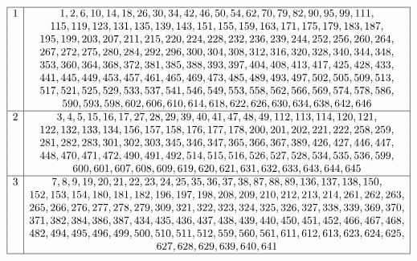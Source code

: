 \begin{table}[H]
	\[
	\begin{array}{|*{2}{c|}}
		\hline
		1 & 1, 2, 6, 10, 14, 18, 26, 30, 34, 42, 46, 50, 54, 62, 70, 79, 82, 90, 95, 99, 111, \\
		& 115, 119, 123, 131, 135, 139, 143, 151, 155, 159, 163, 171, 175, 179, 183, 187, \\
		& 195, 199, 203, 207, 211, 215, 220, 224, 228, 232, 236, 239, 244, 252, 256, 260, 264, \\
		& 267, 272, 275, 280, 284, 292, 296, 300, 304, 308, 312, 316, 320, 328, 340, 344, 348, \\
		& 353, 360, 364, 368, 372, 381, 385, 388, 393, 397, 404, 408, 413, 417, 425, 428, 433, \\
		& 441, 445, 449, 453, 457, 461, 465, 469, 473, 485, 489, 493, 497, 502, 505, 509, 513, \\
		& 517, 521, 525, 529, 533, 537, 541, 546, 549, 553, 558, 562, 566, 569, 574, 578, 586, \\
		& 590, 593, 598, 602, 606, 610, 614, 618, 622, 626, 630, 634, 638, 642, 646 \\
		\hline
		2 & 3, 4, 5, 15, 16, 17, 27, 28, 29, 39, 40, 41, 47, 48, 49, 112, 113, 114, 120, 121, \\
		& 122, 132, 133, 134, 156, 157, 158, 176, 177, 178, 200, 201, 202, 221, 222, 258, 259, \\
		& 281, 282, 283, 301, 302, 303, 345, 346, 347, 365, 366, 367, 389, 426, 427, 446, 447, \\
		& 448, 470, 471, 472, 490, 491, 492, 514, 515, 516, 526, 527, 528, 534, 535, 536, 599, \\
		& 600, 601, 607, 608, 609, 619, 620, 621, 631, 632, 633, 643, 644, 645 \\
		\hline
		3 & 7, 8, 9, 19, 20, 21, 22, 23, 24, 25, 35, 36, 37, 38, 87, 88, 89, 136, 137, 138, 150, \\
		& 152, 153, 154, 180, 181, 182, 196, 197, 198, 208, 209, 210, 212, 213, 214, 261, 262, 263, \\
		& 265, 266, 276, 277, 278, 279, 309, 321, 322, 323, 324, 325, 326, 327, 338, 339, 369, 370, \\
		& 371, 382, 384, 386, 387, 434, 435, 436, 437, 438, 439, 440, 450, 451, 452, 466, 467, 468, \\
		& 482, 494, 495, 496, 499, 500, 510, 511, 512, 559, 560, 561, 611, 612, 613, 623, 624, 625, \\
		& 627, 628, 629, 639, 640, 641 \\
		\hline

\end{array}\]
\end{table}
